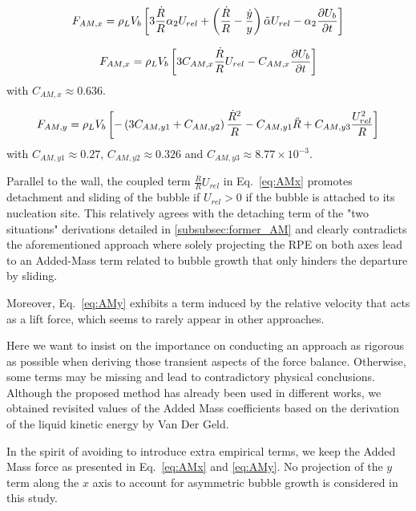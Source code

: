 \begin{align}
F_{AM,x} = \rho_{L}V_{b}\left[ 3\frac{\dot{R}}{R} \alpha_{2}U_{rel} + \left( \frac{\dot{R}}{R} - \frac{\dot{y}}{y}  \right) \tilde{\alpha}U_{rel} - \alpha_{2} \frac{\partial U_{b}}{\partial t}  \right]
\end{align}


\begin{align}
F_{AM,x}=\rho_{L}V_{b}\left[ 3C_{AM,x}\frac{\dot{R}}{R}U_{rel} - C_{AM,x}\frac{\partial{U_{b}}}{\partial t} \right]
\label{eq:AMx}
\end{align}
with $C_{AM,x} \approx 0.636$.


\begin{align}
F_{AM,y}=\rho_{L}V_{b}\left[ -\left( 3 C_{AM,y1} + C_{AM,y2} \right)\frac{\dot{R}^{2}}{R}-C_{AM,y1}\ddot{R} + C_{AM,y3}\frac{U_{rel}^{2}}{R} \right]
\label{eq:AMy}
\end{align}
with $C_{AM,y1} \approx 0.27$, $C_{AM,y2}\approx 0.326$ and $C_{AM,y3}\approx 8.77\times  10^{-3}$.


\npar
 
 


Parallel to the wall, the coupled term $\frac{\dot{R}}{R}U_{rel}$ in Eq.~\ref{eq:AMx} promotes detachment and sliding of the bubble if $U_{rel}>0$ \eg if the bubble is attached to its nucleation site. This relatively agrees with the detaching term of the "two situations" derivations detailed in \ref{subsubsec:former_AM} and clearly contradicts the aforementioned approach where solely projecting the RPE on both axes lead to an Added-Mass term related to bubble growth that only hinders the departure by sliding. 

Moreover, Eq.~\ref{eq:AMy} exhibits a term induced by the relative velocity that acts as a lift force, which seems to rarely appear in other approaches.

\npar
Here we want to insist on the importance on conducting an approach as rigorous as possible when deriving those transient aspects of the force balance. Otherwise, some terms may be missing and lead to contradictory physical conclusions. Although the proposed method has already been used in different works, we obtained revisited values of the Added Mass coefficients based on the derivation of the liquid kinetic energy by Van Der Geld.

In the spirit of avoiding to introduce extra empirical terms, we keep the Added Mass force as presented in Eq.~\ref{eq:AMx} and \ref{eq:AMy}. No projection of the $y$ term along the $x$ axis to account for asymmetric bubble growth is considered in this study.





